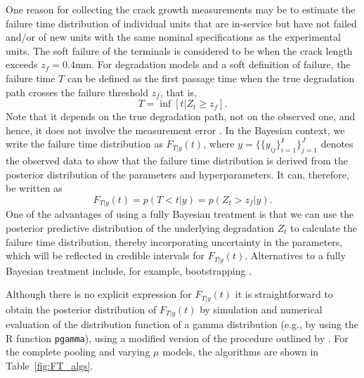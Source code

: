 One reason for collecting the crack growth measurements may be to estimate the failure time distribution of individual units that are in-service but have not failed and/or of new units with the same nominal specifications as the experimental units. The soft failure of the terminals is considered to be when the crack length exceeds $z_f = 0.4$mm. For degradation models and a soft definition of failure, the failure time $T$ can be defined as the first passage time when the true degradation path crosses the failure threshold $z_f$\citep{balakrishnan_2017}, that is,
$$
T = \inf\left[ t|Z_t \geq z_f \right].
$$
Note that it depends on the true degradation path, not on the observed one, and hence, it does not involve the measurement error \citep{hamada_2008}. In the Bayesian context, we write the failure time distribution as $F_{T|y}(t)$, where $y = \{\{y_{ij}\}^I_{i = 1}\}^J_{j = 1}$ denotes the observed data to show that the failure time distribution is derived from the posterior distribution of the parameters and hyperparameters. It can, therefore, be written as
$$
F_{T|y}(t) = p(T < t | y) = p(Z_t > z_f | y).
$$
One of the advantages of using a fully Bayesian treatment is that we can use the posterior predictive distribution of the underlying degradation $Z_t$ to calculate the failure time distribution, thereby incorporating uncertainty in the parameters, which will be reflected in credible intervals for $F_{T|y}(t)$. Alternatives to a fully Bayesian treatment include, for example, bootstrapping \citep{peng_2018}.

Although there is no explicit expression for $F_{T|y}(t)$ it is straightforward to obtain the posterior distribution of $F_{T|y}(t)$ by simulation and numerical evaluation of the distribution function of a gamma distribution (e.g., by using the R function \texttt{pgamma}), using a modified version of the procedure outlined by \citet[Sec.~8.2.1]{hamada_2008}. For the complete pooling and varying $\mu$ models, the algorithms are shown in Table~\ref{fig:FT_algs}.

